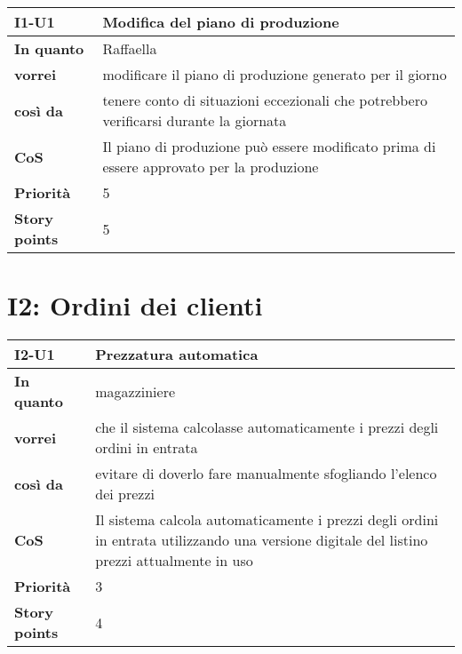 \begin{table}[H]
  \begin{tabularx}{\textwidth}{lX}
    \toprule
    \textbf{I1-U1} & \textbf{Modifica del piano di produzione} \\
    \midrule
    \textbf{In quanto} & Raffaella \\
    \textbf{vorrei} & modificare il piano di produzione generato per il giorno \\
    \textbf{così da} & tenere conto di situazioni eccezionali che potrebbero verificarsi durante la giornata \\
    \midrule
    \textbf{CoS} & Il piano di produzione può essere modificato prima di essere approvato per la produzione \\
    \midrule
    \textbf{Priorità} & 5 \\
    \textbf{Story points} & 5 \\
    \bottomrule
  \end{tabularx}
  \label{user-story:i1-u1}
\end{table}

\section*{I2: Ordini dei clienti}

\begin{table}[H]
  \begin{tabularx}{\textwidth}{lX}
    \toprule
    \textbf{I2-U1} & \textbf{Prezzatura automatica} \\
    \midrule
    \textbf{In quanto} & magazziniere \\
    \textbf{vorrei} & che il sistema calcolasse automaticamente i prezzi degli ordini in entrata \\
    \textbf{così da} & evitare di doverlo fare manualmente sfogliando l'elenco dei prezzi \\
    \midrule
    \textbf{CoS} & Il sistema calcola automaticamente i prezzi degli ordini in entrata utilizzando una versione digitale del listino prezzi attualmente in uso \\
    \midrule
    \textbf{Priorità} & 3 \\
    \textbf{Story points} & 4 \\
    \bottomrule
  \end{tabularx}
  \label{user-story:i2-u1}
\end{table}

